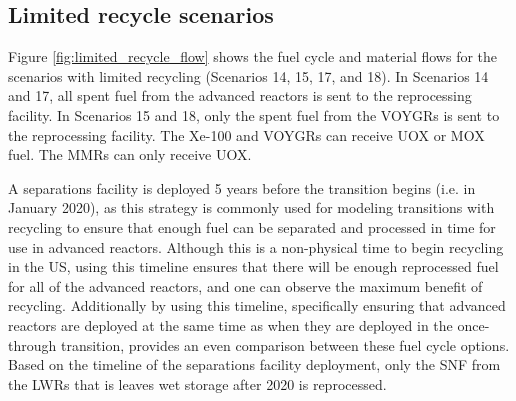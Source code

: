 \subsection{Limited recycle scenarios}
Figure \ref{fig:limited_recycle_flow} shows the fuel cycle and material flows 
for the scenarios with limited recycling (Scenarios 14, 15, 17, and 18). 
In Scenarios 14 and 17, all spent fuel from the advanced reactors is sent 
to the reprocessing facility.
In Scenarios 15 and 18, only the spent fuel from the 
VOYGRs is sent to the reprocessing facility.  The Xe-100 and VOYGRs can receive 
\gls{UOX} or \gls{MOX} fuel. The \glspl{MMR} can only receive 
\gls{UOX}.



A separations facility is deployed 5 years before the transition 
begins (i.e. in January 2020), as this strategy is commonly used for modeling 
transitions with recycling \cite{passerini_systematic_2014,richards_application_2021}
to ensure that enough fuel can be separated and 
processed in time for use in advanced reactors. Although this is a 
non-physical time to begin recycling in the US, using this timeline ensures 
that there will be enough reprocessed fuel for all of the advanced 
reactors, and one can observe the maximum benefit of recycling. Additionally 
by using this timeline, specifically ensuring that advanced reactors 
are deployed at the same time as when they are deployed in the once-through 
transition, provides an even comparison between these fuel cycle options.
Based on the timeline of the separations facility deployment, only the 
\gls{SNF} from the \glspl{LWR} that is leaves wet storage after 
2020 is reprocessed. 

